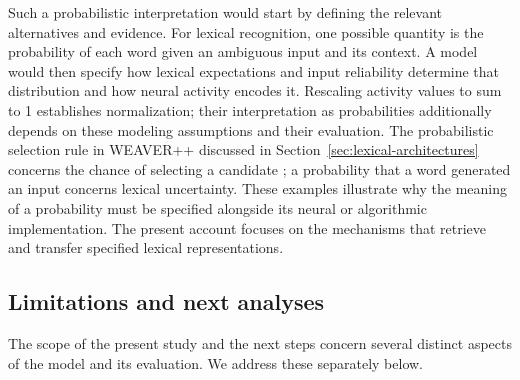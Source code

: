 Such a probabilistic interpretation would start by defining the relevant alternatives and evidence. For lexical recognition, one possible quantity is the probability of each word given an ambiguous input and its context. A model would then specify how lexical expectations and input reliability determine that distribution and how neural activity encodes it. Rescaling activity values to sum to 1 establishes normalization; their interpretation as probabilities additionally depends on these modeling assumptions and their evaluation. The probabilistic selection rule in WEAVER++ discussed in Section~\ref{sec:lexical-architectures} concerns the chance of selecting a candidate \citep{levelt1999}; a probability that a word generated an input concerns lexical uncertainty. These examples illustrate why the meaning of a probability must be specified alongside its neural or algorithmic implementation. The present account focuses on the mechanisms that retrieve and transfer specified lexical representations.

\subsection{Limitations and next analyses}
\label{sec:limitations}
The scope of the present study and the next steps concern several distinct aspects of the model and its evaluation. We address these separately below.

